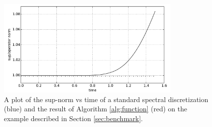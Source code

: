 \documentclass[final,leqno]{siamart}
\begin{document}
\begin{figure}[h!]
	\hspace*{-1.2cm}
	\centering
	\includegraphics[width=0.8\textwidth]{./images/L_inf_plot.pdf}
	\caption{A plot of the sup-norm vs time of a standard spectral discretization (blue) and the result of Algorithm \ref{alg:function} (red) on the example described in Section \ref{sec:benchmark}.}
	\label{fig:norms}
\end{figure}
\end{document}

